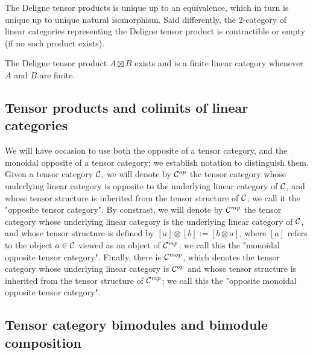 \documentclass{amsart}
\begin{document}
The Deligne tensor products is unique up to an equivalence, which in turn is unique up to unique natural isomorphism. Said differently, the 2-category of linear categories representing the Deligne tensor product is contractible or empty (if no such product exists). 

\begin{proposition}
	The Deligne tensor product $A \boxtimes B$ exists and is a finite linear category whenever $A$ and $B$ are finite. 
\end{proposition}

\subsection{Tensor products and colimits of linear categories} \label{sec-tc-tensorprod}

\begin{definition}
\end{definition}

\begin{definition} \label{def-colim}
\end{definition}


We will have occasion to use both the opposite of a tensor category, and the monoidal opposite of a tensor category; we establish notation to distinguish them.  Given a tensor category $\mathcal C$, we will denote by $\mathcal C^{{op}}$ the tensor category whose underlying linear category is opposite to the underlying linear category of $\mathcal C$, and whose tensor structure is inherited from the tensor structure of $\mathcal C$; we call it the "opposite tensor category".  By constrast, we will denote by $\mathcal C^{{mp}}$ the tensor category whose underlying linear category is the underlying linear category of $\mathcal C$, and whose tensor structure is defined by $[a] \otimes [b] := [b \otimes a]$, where $[a]$ refers to the object $a \in \mathcal C$ viewed as an object of $\mathcal C^{{mp}}$; we call this the "monoidal opposite tensor category".  Finally, there is $\mathcal C^{{mop}}$, which denotes the tensor category whose underlying linear category is $\mathcal C^{{op}}$ and whose tensor structure is inherited from the tensor structure of $\mathcal C^{{mp}}$; we call this the "opposite monoidal opposite tensor category".

\subsection{Tensor category bimodules and bimodule composition} \label{sec-tc-bimod}
\end{document}
